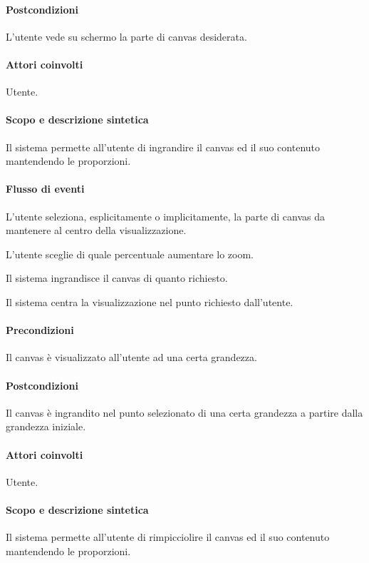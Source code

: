 \paragraph{Postcondizioni} L'utente vede su schermo la parte di canvas desiderata.

\paragraph{Attori coinvolti} Utente.
\paragraph{Scopo e descrizione sintetica} 
Il sistema permette all'utente di ingrandire il canvas ed il suo contenuto mantendendo le proporzioni.
\paragraph{Flusso di eventi}
\begin{elenconumerato}[\textbf{}]{\subsubsecindent}
\item L'utente seleziona, esplicitamente o implicitamente, la parte di canvas da mantenere al centro della visualizzazione.
\item L'utente sceglie di quale percentuale aumentare lo zoom.
\item Il sistema ingrandisce il canvas di quanto richiesto.
\item Il sistema centra la visualizzazione nel punto richiesto dall'utente.
\end{elenconumerato}
\paragraph{Precondizioni} Il canvas \`e visualizzato all'utente ad una certa grandezza.
\paragraph{Postcondizioni} Il canvas \`e ingrandito nel punto selezionato di una certa grandezza a partire dalla grandezza iniziale.

\paragraph{Attori coinvolti} Utente.
\paragraph{Scopo e descrizione sintetica} 
Il sistema permette all'utente di rimpicciolire il canvas ed il suo contenuto mantendendo le proporzioni.
